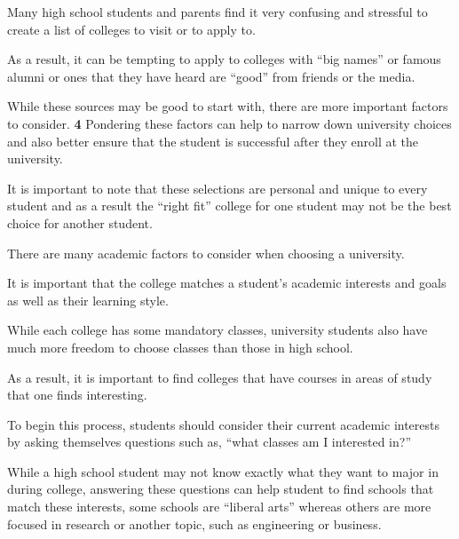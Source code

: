 \bigskip
\begin{inparaenum}[\bfseries 1]
\indent \item Many high school students and parents find it very confusing and stressful to create a list of colleges to visit or to apply to. \item As a result, it can be tempting to apply to colleges with ``big names'' or famous alumni or ones that they have heard are ``good'' from friends or the media. \item While these sources may be good to start with, there are more important factors to consider. \textbf{4} Pondering these factors can help to narrow down university choices and also better ensure that the student is successful after they enroll at the university. \item It is important to note that these selections are personal and unique to every student and as a result the ``right fit'' college for one student may not be the best choice for another student. 

\indent \item There are many academic factors to consider when choosing a university. \item It is important that the college matches a student's academic interests and goals as well as their learning style. \item While each college has some mandatory classes, university students also have much more freedom to choose classes than those in high school. \item As a result, it is important to find colleges that have courses in areas of study that one finds interesting. \item To begin this process, students should consider their current academic interests by asking themselves questions such as, ``what classes am I interested in?'' \item While a high school student may not know exactly what they want to major in during college, answering these questions can help student to find schools that match these interests, some schools are ``liberal arts'' whereas others are more focused in research or another topic, such as engineering or business.


\end{inparaenum}
